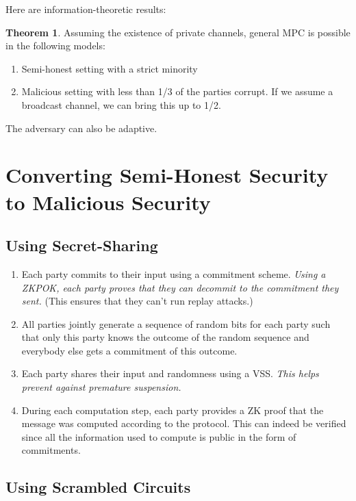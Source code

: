 \documentclass{article}
\theoremstyle{definition}
\newtheorem{theorem}{Theorem}[section]
\begin{document}
Here are information-theoretic results:

\begin{theorem}
    Assuming the existence of private channels, general MPC is possible in the following models:

    \begin{enumerate}
        \item Semi-honest setting with a strict minority
        \item Malicious setting with less than 1/3 of the parties corrupt. If we assume a broadcast channel,
        we can bring this up to 1/2.
    \end{enumerate}

    The adversary can also be adaptive.
\end{theorem}

\newpage

\section{Converting Semi-Honest Security to Malicious Security}

\subsection{Using Secret-Sharing}

\begin{enumerate}
    \item Each party commits to their input using a commitment scheme. \textit{Using a ZKPOK, each party proves that
    they can decommit to the commitment they sent.} (This ensures that they can't run replay attacks.)
    \item All parties jointly generate a sequence of random bits for each party such that only this party knows
    the outcome of the random sequence and everybody else gets a commitment of this outcome.
    \item Each party shares their input and randomness using a VSS. \textit{This helps prevent against premature suspension.}
    \item During each computation step, each party provides a ZK proof that the message was computed according to the protocol.
    This can indeed be verified since all the information used to compute is public in the form of commitments.
\end{enumerate}

\subsection{Using Scrambled Circuits}
\end{document}
